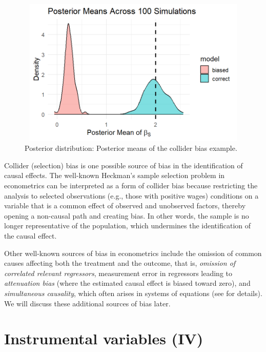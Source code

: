 \begin{figure}[h!]
	\includegraphics[width=340pt, height=200pt]{Chapters/chapter12/figures/FigColliderBias.png}
	\caption[List of figure caption goes here]{Posterior distribution: Posterior means of the collider bias example.}\label{fig12_2}
\end{figure}

Collider (selection) bias is one possible source of bias in the identification of causal effects. The well-known Heckman’s sample selection problem in econometrics \cite{heckman1979sample} can be interpreted as a form of collider bias because restricting the analysis to selected observations (e.g., those with positive wages) conditions on a variable that is a common effect of observed and unobserved factors, thereby opening a non-causal path and creating bias. In other words, the sample is no longer representative of the population, which undermines the identification of the causal effect. 

Other well-known sources of bias in econometrics include the omission of common causes affecting both the treatment and the outcome, that is, \textit{omission of correlated relevant regressors}, measurement error in regressors leading to \textit{attenuation bias} (where the estimated causal effect is biased toward zero), and \textit{simultaneous causality}, which often arises in systems of equations (see \cite{wooldridge2010econometric} for details). We will discuss these additional sources of bias later.

\section{Instrumental variables (IV)}\label{chap12_4}

